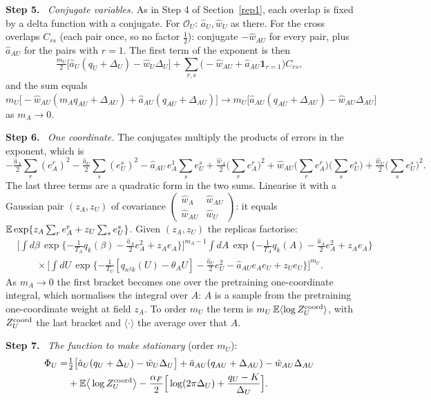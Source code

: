 \documentclass[10pt]{article}
\newcommand{\step}[1]{\par\smallskip\textbf{Step #1.}\ }
\begin{document}
\step5 \emph{Conjugate variables.} As in Step 4 of Section~\ref{rep1}, each overlap is fixed by a delta function with a conjugate. For $\mathcal O_U$: $\hat a_U,\hat w_U$ as there. For the cross overlaps $C_{rs}$ (each pair once, so no factor $\frac12$): conjugate $-\hat w_{AU}$ for every pair, plus $\hat a_{AU}$ for the pairs with $r=1$. The first term of the exponent is then
\[
\tfrac{m_U}2\big[\hat a_U(q_U+\Delta_U)-\hat w_U\Delta_U\big]+\sum_{r,s}\big(-\hat w_{AU}+\hat a_{AU}\mathbf 1_{r=1}\big)C_{rs},
\]
and the sum equals $m_U\big[-\hat w_{AU}(m_Aq_{AU}+\Delta_{AU})+\hat a_{AU}(q_{AU}+\Delta_{AU})\big]\to m_U\big[\hat a_{AU}(q_{AU}+\Delta_{AU})-\hat w_{AU}\Delta_{AU}\big]$ as $m_A\to0$.
\step6 \emph{One coordinate.} The conjugates multiply the products of errors in the exponent, which is
\[
-\tfrac{\hat a_A}2\sum_r(e_A^r)^2-\tfrac{\hat a_U}2\sum_s(e_U^s)^2-\hat a_{AU}\,e_A^1\sum_se_U^s+\tfrac{\hat w_A}2\Big(\sum_re_A^r\Big)^2+\hat w_{AU}\Big(\sum_re_A^r\Big)\Big(\sum_se_U^s\Big)+\tfrac{\hat w_U}2\Big(\sum_se_U^s\Big)^2 .
\]
The last three terms are a quadratic form in the two sums. Linearise it with a Gaussian pair $(z_A,z_U)$ of covariance $\begin{pmatrix}\hat w_A&\hat w_{AU}\\\hat w_{AU}&\hat w_U\end{pmatrix}$: it equals $\mathbb E\exp\{z_A\sum_re_A^r+z_U\sum_se_U^s\}$. Given $(z_A,z_U)$ the replicas factorise:
\[
\begin{aligned}
&\Big[\int\!d\beta\,\exp\{-\tfrac1{T_A}q_k(\beta)-\tfrac{\hat a_A}2e_A^2+z_Ae_A\}\Big]^{m_A-1}\!\int\!dA\,\exp\{-\tfrac1{T_A}q_k(A)-\tfrac{\hat a_A}2e_A^2+z_Ae_A\}\\
&\qquad\times\Big[\int\!dU\,\exp\{-\tfrac1{T_U}[q_{\kappa^2k}(U)-\theta_AU]-\tfrac{\hat a_U}2e_U^2-\hat a_{AU}e_Ae_U+z_Ue_U\}\Big]^{m_U} .
\end{aligned}
\]
As $m_A\to0$ the first bracket becomes one over the pretraining one-coordinate integral, which normalises the integral over $A$: $A$ is a sample from the pretraining one-coordinate weight at field $z_A$. To order $m_U$ the term is $m_U\,\mathbb E\langle\log Z_U^{\rm coord}\rangle$, with $Z_U^{\rm coord}$ the last bracket and $\langle\cdot\rangle$ the average over that $A$.
\step7 \emph{The function to make stationary} (order $m_U$):
\[
\begin{aligned}\Phi_U=&\tfrac12\big[\hat a_U(q_U+\Delta_U)-\hat w_U\Delta_U\big]+\hat a_{AU}(q_{AU}+\Delta_{AU})-\hat w_{AU}\Delta_{AU}\\&+\mathbb E\big\langle\log Z_U^{\rm coord}\big\rangle-\frac{\alpha_F}2\Big[\log(2\pi\Delta_U)+\frac{q_U-K}{\Delta_U}\Big].\end{aligned}
\]
\end{document}
